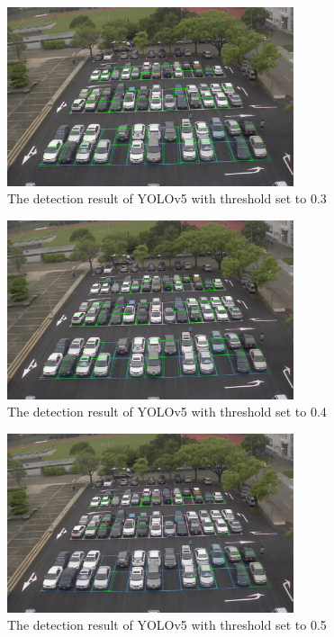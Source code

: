 \documentclass{article}[12pt, twocolumn]
\begin{document}
\begin{figure}[H]
    \centering
    \includegraphics[width=0.75\textwidth]{figure/Yolov5_first_frame_3.png}
    \caption{The detection result of YOLOv5 with threshold set to 0.3}
\end{figure}


\begin{figure}[H]
    \centering
    \includegraphics[width=0.75\textwidth]{figure/Yolov5_first_frame_4.png}
    \caption{The detection result of YOLOv5 with threshold set to 0.4}
\end{figure}


\begin{figure}[H]
    \centering
    \includegraphics[width=0.75\textwidth]{figure/Yolov5_first_frame_5.png}
    \caption{The detection result of YOLOv5 with threshold set to 0.5}
\end{figure}
\end{document}

